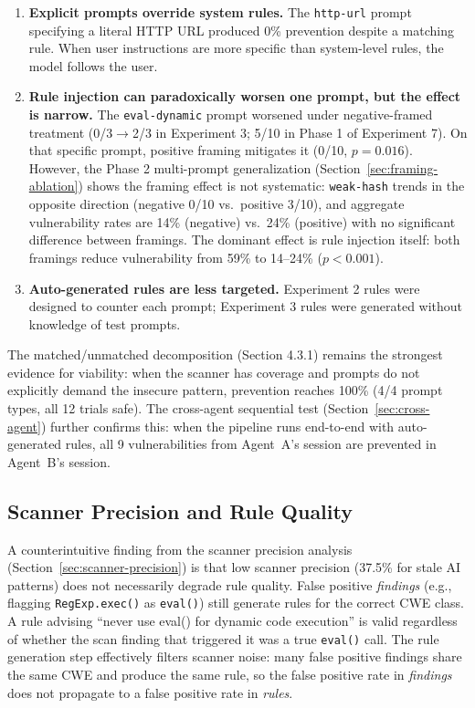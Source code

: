 \documentclass[conference,10pt]{IEEEtran}
\begin{document}
\begin{enumerate}
    \item \textbf{Explicit prompts override system rules.} The \texttt{http-url} prompt specifying a literal HTTP URL produced 0\% prevention despite a matching rule. When user instructions are more specific than system-level rules, the model follows the user.
    \item \textbf{Rule injection can paradoxically worsen one prompt, but the effect is narrow.} The \texttt{eval-dynamic} prompt worsened under negative-framed treatment (0/3$\rightarrow$2/3 in Experiment 3; 5/10 in Phase 1 of Experiment 7). On that specific prompt, positive framing mitigates it (0/10, $p{=}0.016$). However, the Phase 2 multi-prompt generalization (Section~\ref{sec:framing-ablation}) shows the framing effect is not systematic: \texttt{weak-hash} trends in the opposite direction (negative 0/10 vs.\ positive 3/10), and aggregate vulnerability rates are 14\% (negative) vs.\ 24\% (positive) with no significant difference between framings. The dominant effect is rule injection itself: both framings reduce vulnerability from 59\% to 14--24\% ($p{<}0.001$).
    \item \textbf{Auto-generated rules are less targeted.} Experiment 2 rules were designed to counter each prompt; Experiment 3 rules were generated without knowledge of test prompts.
\end{enumerate}

The matched/unmatched decomposition (Section 4.3.1) remains the strongest evidence for viability: when the scanner has coverage and prompts do not explicitly demand the insecure pattern, prevention reaches 100\% (4/4 prompt types, all 12 trials safe). The cross-agent sequential test (Section~\ref{sec:cross-agent}) further confirms this: when the pipeline runs end-to-end with auto-generated rules, all 9 vulnerabilities from Agent~A's session are prevented in Agent~B's session.

\subsection{Scanner Precision and Rule Quality}

A counterintuitive finding from the scanner precision analysis (Section~\ref{sec:scanner-precision}) is that low scanner precision (37.5\% for stale AI patterns) does not necessarily degrade rule quality. False positive \textit{findings} (e.g., flagging \texttt{RegExp.exec()} as \texttt{eval()}) still generate rules for the correct CWE class. A rule advising ``never use eval() for dynamic code execution'' is valid regardless of whether the scan finding that triggered it was a true \texttt{eval()} call. The rule generation step effectively filters scanner noise: many false positive findings share the same CWE and produce the same rule, so the false positive rate in \textit{findings} does not propagate to a false positive rate in \textit{rules}.
\end{document}
